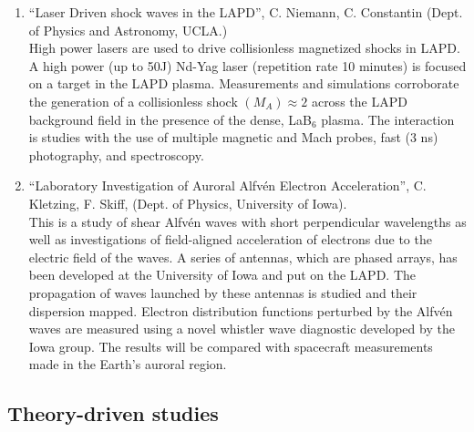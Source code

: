 \documentclass[11pt]{article}
\begin{document}
\begin{enumerate}

\item ``Laser Driven shock waves in the LAPD'', C. Niemann,
  C. Constantin (Dept. of Physics and Astronomy,
  UCLA.)\\ High power lasers are used to drive collisionless
  magnetized shocks in LAPD.  A high power (up to 50J) Nd-Yag laser (repetition rate 10
  minutes) is focused on a target in the LAPD plasma. Measurements and
  simulations corroborate the generation of a collisionless shock
  $(M_{A})\approx 2$ across the LAPD background field in the presence
  of the dense, LaB$_{6}$ plasma. The interaction is studies with the
  use of multiple magnetic and Mach probes, fast (3 ns) photography,
  and spectroscopy.

\item ``Laboratory Investigation of Auroral Alfv\'{e}n Electron
  Acceleration'', C. Kletzing, F. Skiff, (Dept. of Physics, University
  of Iowa).\\ This is a study of shear Alfv\'{e}n waves with short
  perpendicular wavelengths as well as investigations of field-aligned
  acceleration of electrons due to the electric field of the waves. A
  series of antennas, which are phased arrays, has been developed at
  the University of Iowa and put on the LAPD. The propagation of waves
  launched by these antennas is studied and their dispersion
  mapped. Electron distribution functions perturbed by the Alfv\'{e}n
  waves are measured using a novel whistler wave diagnostic developed
  by the Iowa group. The results will be compared with spacecraft
  measurements made in the Earth's auroral region.

%

\end{enumerate}

\subsection{Theory-driven studies}
\end{document}
